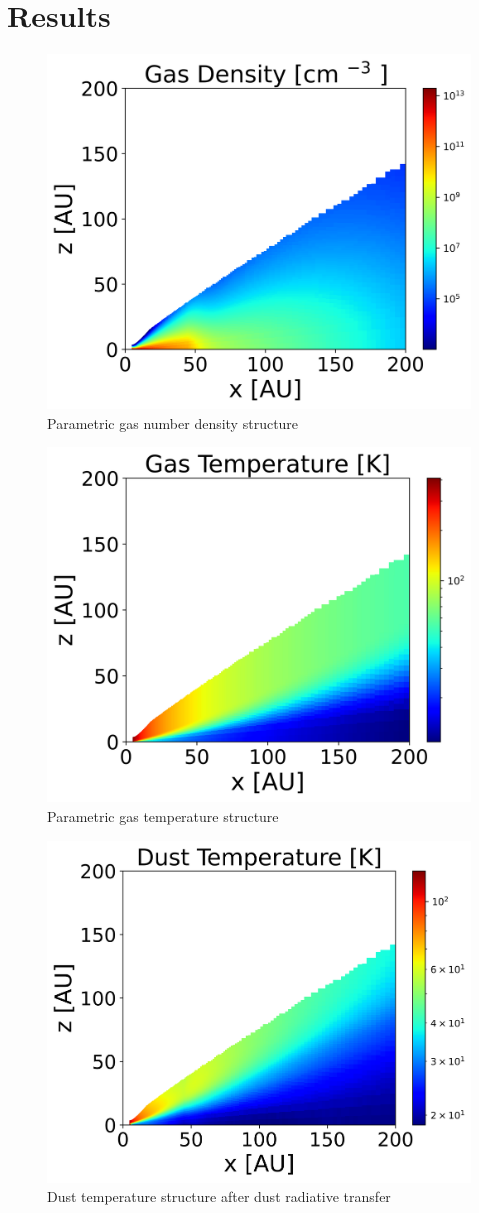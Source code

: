 \section{Results}
\begin{figure}[h]
	\centering
	\includegraphics[width=0.6\linewidth]{n_gas}
	\caption{Parametric gas number density structure}
	\label{fig:ngas}
\end{figure}
\begin{figure}[h!]
	\centering
	\includegraphics[width=0.6\linewidth]{Tgas}
	\caption{Parametric gas temperature structure}
	\label{fig:Tgas}
\end{figure}
\begin{figure}
	\centering
	\includegraphics[width=0.6\linewidth]{Tdust}
	\caption{Dust temperature structure after dust radiative transfer}
	\label{fig:Tdust}
\end{figure}
